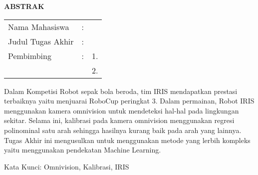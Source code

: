 \begin{center}
  \large\textbf{ABSTRAK}
\end{center}


\vspace{2ex}

\begingroup
\setlength{\tabcolsep}{0pt}

\noindent
\begin{tabularx}{\textwidth}{l >{\centering}m{2em} X}
  Nama Mahasiswa    & : & \name{}         \\

  Judul Tugas Akhir & : & \tatitle{}      \\

  Pembimbing        & : & 1. \advisor{}   \\
                    &   & 2. \coadvisor{} \\
\end{tabularx}
\endgroup

Dalam Kompetisi Robot sepak bola beroda, tim IRIS mendapatkan 
prestasi terbaiknya yaitu menjuarai RoboCup peringkat 3. 
Dalam permainan, Robot IRIS menggunakan kamera omnivision untuk 
mendeteksi hal-hal pada lingkungan sekitar. Selama ini, kalibrasi 
pada kamera omnivision menggunakan regresi polinominal satu arah sehingga 
hasilnya kurang baik pada arah yang lainnya. Tugas Akhir ini mengusulkan 
untuk menggunakan metode yang lerbih kompleks yaitu menggunakan 
pendekatan Machine Learning. 

Kata Kunci: Omnivision, Kalibrasi, IRIS
